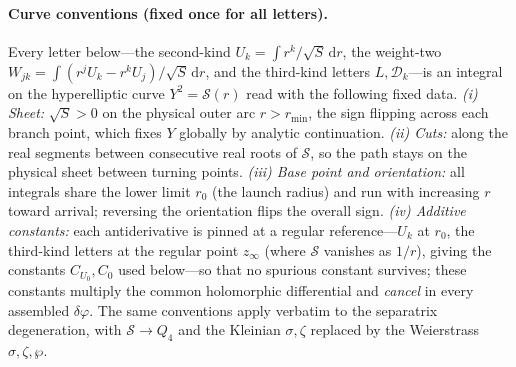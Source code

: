\documentclass[12pt]{iopart}
\newcommand{\dd}{\mathrm{d}}
\begin{document}
\paragraph{Curve conventions (fixed once for all letters).} Every letter
below---the second-kind $U_k=\int r^k/\sqrt S\,\dd r$, the weight-two
$W_{jk}=\int(r^jU_k-r^kU_j)/\sqrt S\,\dd r$, and the third-kind letters $L,\mathcal
D_k$---is an integral on the hyperelliptic curve $Y^2=\mathcal S(r)$ read with the
following fixed data. \emph{(i) Sheet:} $\sqrt S>0$ on the physical outer arc
$r>r_{\min}$, the sign flipping across each branch point, which fixes $Y$ globally by
analytic continuation. \emph{(ii) Cuts:} along the real segments between consecutive
real roots of $\mathcal S$, so the path stays on the physical sheet between turning
points. \emph{(iii) Base point and orientation:} all integrals share the lower limit
$r_0$ (the launch radius) and run with increasing $r$ toward arrival; reversing the
orientation flips the overall sign. \emph{(iv) Additive constants:} each
antiderivative is pinned at a regular reference---$U_k$ at $r_0$, the third-kind
letters at the regular point $z_\infty$ (where $\mathcal S$ vanishes as $1/r$), giving
the constants $C_{U_0},C_0$ used below---so that no spurious constant survives; these
constants multiply the common holomorphic differential and \emph{cancel} in every
assembled $\delta\varphi$. The same conventions apply verbatim to the separatrix
degeneration, with $\mathcal S\to Q_4$ and the Kleinian $\sigma,\zeta$ replaced by the
Weierstrass $\sigma,\zeta,\wp$.
\end{document}
